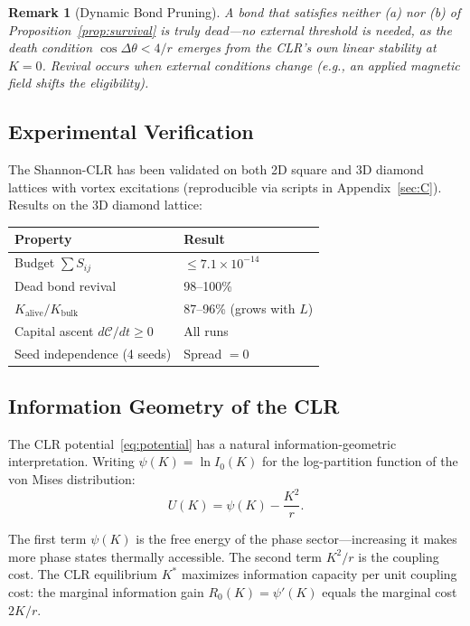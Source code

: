 \documentclass[aps,prd,onecolumn,superscriptaddress,floatfix,12pt]{revtex4-2}
\newcommand{\Rzero}{R_0}
\newcommand{\Kbulk}{K_{\text{bulk}}}
\newtheorem{remark}{Remark}[section]
\begin{document}
\begin{remark}[Dynamic Bond Pruning]
A bond that satisfies neither (a) nor (b) of Proposition~\ref{prop:survival} is truly dead---no external threshold is needed, as the death condition $\cos\Delta\theta < 4/r$ emerges from the CLR's own linear stability at $K = 0$. Revival occurs when external conditions change (e.g., an applied magnetic field shifts the eligibility).
\end{remark}

\subsection{Experimental Verification}\label{sec:2-4}

The Shannon-CLR has been validated on both 2D square and 3D diamond lattices with vortex excitations (reproducible via scripts in Appendix~\ref{sec:C}). Results on the 3D diamond lattice:

\begin{table}[h]
\begin{tabular}{@{}p{}l@{}}
\toprule
Property & Result \\
\midrule
Budget $\sum S_{ij}$ & $\leq 7.1 \times 10^{-14}$ \\
Dead bond revival & 98--100\% \\
$K_{\text{alive}}/\Kbulk$ & 87--96\% (grows with $L$) \\
Capital ascent $d\mathcal{C}/dt \geq 0$ & All runs \\
Seed independence (4 seeds) & Spread $= 0$ \\
\bottomrule
\end{tabular}
\end{table}

\subsection{Information Geometry of the CLR}\label{sec:2-5}

The CLR potential~\eqref{eq:potential} has a natural information-geometric interpretation. Writing $\psi(K) = \ln I_0(K)$ for the log-partition function of the von Mises distribution:
\begin{equation}\label{eq:utility}
U(K) = \psi(K) - \frac{K^2}{r}.
\end{equation}

The first term $\psi(K)$ is the free energy of the phase sector---increasing it makes more phase states thermally accessible. The second term $K^2/r$ is the coupling cost. The CLR equilibrium $K^*$ maximizes information capacity per unit coupling cost: the marginal information gain $\Rzero(K) = \psi'(K)$ equals the marginal cost $2K/r$.
\end{document}
